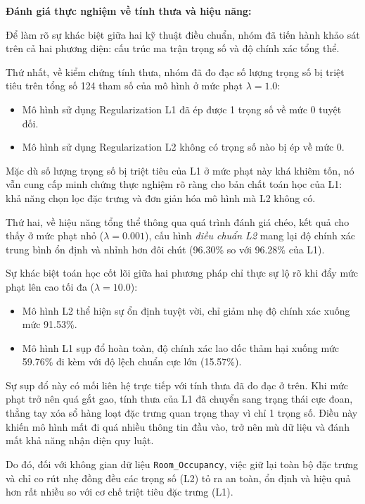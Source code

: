 \textbf{Đánh giá thực nghiệm về tính thưa và hiệu năng:}

Để làm rõ sự khác biệt giữa hai kỹ thuật điều chuẩn, nhóm đã tiến hành khảo sát trên cả hai phương diện: cấu trúc ma trận trọng số và độ chính xác tổng thể. 

Thứ nhất, về kiểm chứng tính thưa, nhóm đã đo đạc số lượng trọng số bị triệt tiêu trên tổng số 124 tham số của mô hình ở mức phạt $\lambda = 1.0$:
\begin{itemize}
    \item Mô hình sử dụng Regularization L1 đã ép được 1 trọng số về mức 0 tuyệt đối.
    \item Mô hình sử dụng Regularization L2 không có trọng số nào bị ép về mức 0.
\end{itemize}

Mặc dù số lượng trọng số bị triệt tiêu của L1 ở mức phạt này khá khiêm tốn, nó vẫn cung cấp minh chứng thực nghiệm rõ ràng cho bản chất toán học của L1: khả năng chọn lọc đặc trưng và đơn giản hóa mô hình mà L2 không có.

Thứ hai, về hiệu năng tổng thể thông qua quá trình đánh giá chéo, kết quả cho thấy ở mức phạt nhỏ ($\lambda=0.001$), cấu hình \textit{điều chuẩn L2} mang lại độ chính xác trung bình ổn định và nhỉnh hơn đôi chút (96.30\% so với 96.28\% của L1). 

Sự khác biệt toán học cốt lõi giữa hai phương pháp chỉ thực sự lộ rõ khi đẩy mức phạt lên cao tối đa ($\lambda=10.0$):
\begin{itemize}
    \item Mô hình L2 thể hiện sự ổn định tuyệt vời, chỉ giảm nhẹ độ chính xác xuống mức 91.53\%.
    \item Mô hình L1 sụp đổ hoàn toàn, độ chính xác lao dốc thảm hại xuống mức 59.76\% đi kèm với độ lệch chuẩn cực lớn (15.57\%). 
\end{itemize}

Sự sụp đổ này có mối liên hệ trực tiếp với tính thưa đã đo đạc ở trên. Khi mức phạt trở nên quá gắt gao, tính thưa của L1 đã chuyển sang trạng thái cực đoan, thẳng tay xóa sổ hàng loạt đặc trưng quan trọng thay vì chỉ 1 trọng số. Điều này khiến mô hình mất đi quá nhiều thông tin đầu vào, trở nên mù dữ liệu và đánh mất khả năng nhận diện quy luật.

Do đó, đối với không gian dữ liệu \texttt{Room\_Occupancy}, việc giữ lại toàn bộ đặc trưng và chỉ co rút nhẹ đồng đều các trọng số (L2) tỏ ra an toàn, ổn định và hiệu quả hơn rất nhiều so với cơ chế triệt tiêu đặc trưng (L1).

